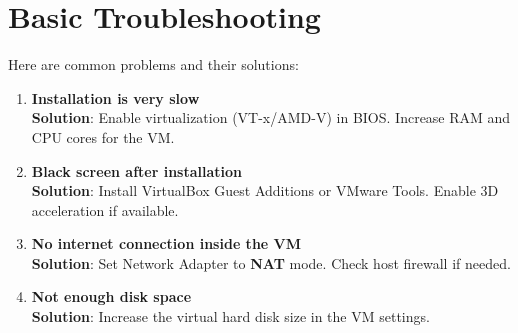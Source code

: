 \section{Basic Troubleshooting}
Here are common problems and their solutions:
\begin{enumerate}
    \item \textbf{Installation is very slow}\\
    \textbf{Solution}: Enable virtualization (VT-x/AMD-V) in BIOS. Increase RAM and CPU cores for the VM.
    \item \textbf{Black screen after installation}\\
    \textbf{Solution}: Install VirtualBox Guest Additions or VMware Tools. Enable 3D acceleration if available.
    \item \textbf{No internet connection inside the VM}\\
    \textbf{Solution}: Set Network Adapter to \textbf{NAT} mode. Check host firewall if needed.
    \item \textbf{Not enough disk space}\\
    \textbf{Solution}: Increase the virtual hard disk size in the VM settings.
\end{enumerate}